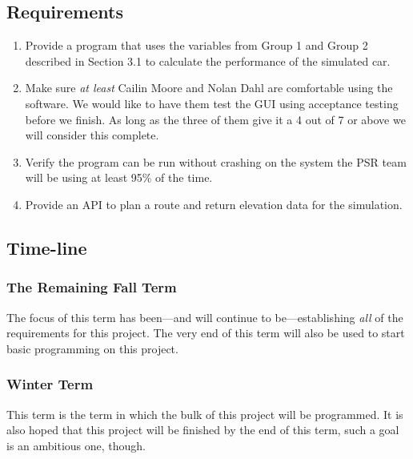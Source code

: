 \documentclass[onecolumn, draftclsnofoot,10pt, compsoc]{IEEEtran}
\begin{document}
\begin{singlespace}
    \subsection{Requirements}
    \begin{enumerate}
        \item Provide a program that uses the variables from Group 1 and Group 2 described in Section 3.1 to calculate the performance of the simulated car. 
        \item Make sure \textit{at least} Cailin Moore and Nolan Dahl are comfortable using the software. We would like to have them test the GUI using acceptance testing before we finish. As long as the three of them give it a 4 out of 7 or above we will consider this complete.
        \item Verify the program can be run without crashing on the system the PSR team will be using at least 95\% of the time.
        \item Provide an API to plan a route and return elevation data for the simulation.
    \end{enumerate}
    
    \subsection{Time-line}
        \subsubsection{The Remaining Fall Term}
        The focus of this term has been---and will continue to be---establishing \textit{all} of the requirements for this project. The very end of this term will also be used to start basic programming on this project.
        
        \subsubsection{Winter Term}
        This term is the term in which the bulk of this project will be programmed. It is also hoped that this project will be finished by the end of this term, such a goal is an ambitious one, though.
        

\end{singlespace}
\end{document}
